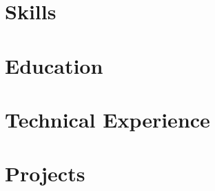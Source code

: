 \documentclass[letter,10pt]{article}
\begin{document}


\section{Skills}


\section{Education}


\section{Technical Experience}



\section{Projects}


% 
\end{document}

